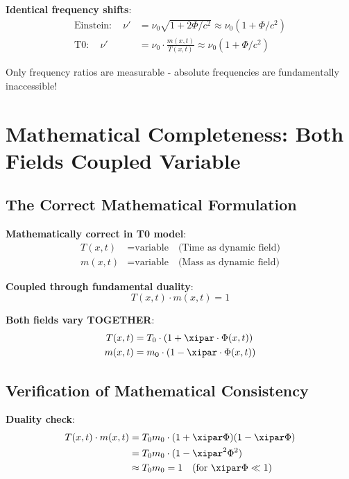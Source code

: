 	\textbf{Identical frequency shifts}:
	\begin{align}
		\text{Einstein}: \quad \nu' &= \nu_0 \sqrt{1 + 2\Phi/c^2} \approx \nu_0 (1 + \Phi/c^2) \\
		\text{T0}: \quad \nu' &= \nu_0 \cdot \frac{m(x,t)}{T(x,t)} \approx \nu_0 (1 + \Phi/c^2)
	\end{align}
	
	Only frequency ratios are measurable - absolute frequencies are fundamentally inaccessible!
	
	\section{Mathematical Completeness: Both Fields Coupled Variable}
	
	\subsection{The Correct Mathematical Formulation}
	
	\textbf{Mathematically correct in T0 model}:
	\begin{align}
		T(x,t) &= \text{variable} \quad \text{(Time as dynamic field)} \\
		m(x,t) &= \text{variable} \quad \text{(Mass as dynamic field)}
	\end{align}
	
	\textbf{Coupled through fundamental duality}:
	\begin{equation}
		T(x,t) \cdot m(x,t) = 1
	\end{equation}
	
	\textbf{Both fields vary TOGETHER}:
	\begin{align}
		T(x,t) &= T_0 \cdot (1 + \xipar \cdot \Phi(x,t)) \\
		m(x,t) &= m_0 \cdot (1 - \xipar \cdot \Phi(x,t))
	\end{align}
	
	\subsection{Verification of Mathematical Consistency}
	
	\textbf{Duality check}:
	\begin{align}
		T(x,t) \cdot m(x,t) &= T_0 m_0 \cdot (1 + \xipar \Phi)(1 - \xipar \Phi) \\
		&= T_0 m_0 \cdot (1 - \xipar^2 \Phi^2) \\
		&\approx T_0 m_0 = 1 \quad \text{(for } \xipar \Phi \ll 1\text{)}
	\end{align}
	
